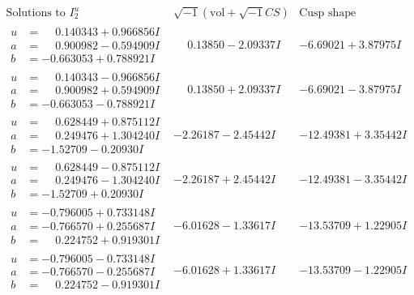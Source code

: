 \documentclass[1p]{elsarticle_modified}
\theoremstyle{definition}
\newcommand{\I}{\sqrt{-1}}
\begin{document}
$$\begin{array}{c|c|c}  
\text{Solutions to }I^u_{2}& \I (\text{vol} + \sqrt{-1}CS) & \text{Cusp shape}\\
 \hline 
\begin{aligned}
u &= \phantom{-}0.140343 + 0.966856 I \\
a &= \phantom{-}0.900982 - 0.594909 I \\
b &= -0.663053 + 0.788921 I\end{aligned}
 & \phantom{-}0.13850 - 2.09337 I & -6.69021 + 3.87975 I \\ \hline\begin{aligned}
u &= \phantom{-}0.140343 - 0.966856 I \\
a &= \phantom{-}0.900982 + 0.594909 I \\
b &= -0.663053 - 0.788921 I\end{aligned}
 & \phantom{-}0.13850 + 2.09337 I & -6.69021 - 3.87975 I \\ \hline\begin{aligned}
u &= \phantom{-}0.628449 + 0.875112 I \\
a &= \phantom{-}0.249476 + 1.304240 I \\
b &= -1.52709 - 0.20930 I\end{aligned}
 & -2.26187 - 2.45442 I & -12.49381 + 3.35442 I \\ \hline\begin{aligned}
u &= \phantom{-}0.628449 - 0.875112 I \\
a &= \phantom{-}0.249476 - 1.304240 I \\
b &= -1.52709 + 0.20930 I\end{aligned}
 & -2.26187 + 2.45442 I & -12.49381 - 3.35442 I \\ \hline\begin{aligned}
u &= -0.796005 + 0.733148 I \\
a &= -0.766570 + 0.255687 I \\
b &= \phantom{-}0.224752 + 0.919301 I\end{aligned}
 & -6.01628 - 1.33617 I & -13.53709 + 1.22905 I \\ \hline\begin{aligned}
u &= -0.796005 - 0.733148 I \\
a &= -0.766570 - 0.255687 I \\
b &= \phantom{-}0.224752 - 0.919301 I\end{aligned}
 & -6.01628 + 1.33617 I & -13.53709 - 1.22905 I \\ \hline\begin{aligned}

\end{aligned}
\end{array}$$
\end{document}
